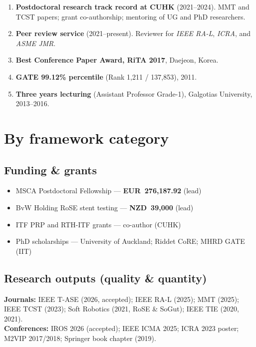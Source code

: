 \documentclass[11pt,a4paper]{article}
\newcommand{\rank}[1]{\textcolor{rankgold}{\textbf{#1}}}
\begin{document}
\begin{enumerate}[leftmargin=1.6em, itemsep=0.55em, label=\rank{\arabic*.}]
  \item \textbf{Postdoctoral research track record at CUHK} (2021--2024).
  MMT and TCST papers; grant co-authorship; mentoring of UG and PhD researchers.

  \item \textbf{Peer review service} (2021--present).
  Reviewer for \textit{IEEE RA-L}, \textit{ICRA}, and \textit{ASME JMR}.

  \item \textbf{Best Conference Paper Award, RiTA 2017}, Daejeon, Korea.

  \item \textbf{GATE 99.12\% percentile} (Rank 1,211 / 137,853), 2011.

  \item \textbf{Three years lecturing} (Assistant Professor Grade-1), Galgotias University, 2013--2016.

\end{enumerate}

\section*{By framework category}

\subsection*{\sffamily\color{accent} Funding \& grants}
\begin{itemize}[leftmargin=1.4em, itemsep=0.35em]
  \item MSCA Postdoctoral Fellowship --- \textbf{EUR~276,187.92} (lead)
  \item BvW Holding RoSE stent testing --- \textbf{NZD~39,000} (lead)
  \item ITF PRP and RTH-ITF grants --- co-author (CUHK)
  \item PhD scholarships --- University of Auckland; Riddet CoRE; MHRD GATE (IIT)
\end{itemize}

\subsection*{\sffamily\color{accent} Research outputs (quality \& quantity)}
\textbf{Journals:} IEEE T-ASE (2026, accepted); IEEE RA-L (2025); MMT (2025); IEEE TCST (2023); Soft Robotics (2021, RoSE \& SoGut); IEEE TIE (2020, 2021).\\
\textbf{Conferences:} IROS 2026 (accepted); IEEE ICMA 2025; ICRA 2023 poster; M2VIP 2017/2018; Springer book chapter (2019).
\end{document}
